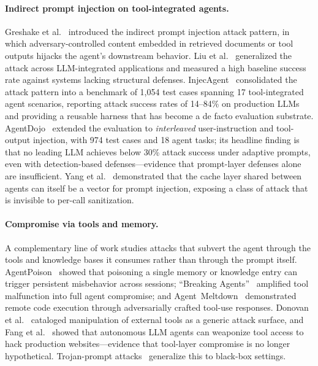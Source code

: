 \paragraph{Indirect prompt injection on tool-integrated agents.}
Greshake et al.~\cite{greshake2023not} introduced the indirect prompt
injection attack pattern, in which adversary-controlled content embedded in
retrieved documents or tool outputs hijacks the agent's downstream
behavior. Liu et al.~\cite{liu2024promptinjection} generalized the attack
across LLM-integrated applications and measured a high baseline success
rate against systems lacking structural defenses.
InjecAgent~\cite{zhan2024injecagent} consolidated the attack pattern into a
benchmark of 1{,}054 test cases spanning 17 tool-integrated agent scenarios,
reporting attack success rates of 14--84\% on production LLMs and providing
a reusable harness that has become a de facto evaluation substrate.
AgentDojo~\cite{debenedetti2024agentdojo} extended the evaluation to
\emph{interleaved} user-instruction and tool-output injection, with 974 test
cases and 18 agent tasks; its headline finding is that no leading LLM
achieves below 30\% attack success under adaptive prompts, even with
detection-based defenses---evidence that prompt-layer defenses alone are
insufficient. Yang et al.~\cite{yang2024cache} demonstrated that the cache
layer shared between agents can itself be a vector for prompt injection,
exposing a class of attack that is invisible to per-call sanitization.

\paragraph{Compromise via tools and memory.}
A complementary line of work studies attacks that subvert the agent through
the tools and knowledge bases it consumes rather than through the prompt
itself. AgentPoison~\cite{chen2024agentsecurity} showed that poisoning a
single memory or knowledge entry can trigger persistent misbehavior across
sessions; ``Breaking Agents''~\cite{zhang2024breaking} amplified tool
malfunction into full agent compromise; and
Agent~Meltdown~\cite{struppek2024agent} demonstrated remote code execution
through adversarially crafted tool-use responses. Donovan
et al.~\cite{donovan2024compromising} cataloged manipulation of external
tools as a generic attack surface, and Fang et al.~\cite{fang2024llm}
showed that autonomous LLM agents can weaponize tool access to hack
production websites---evidence that tool-layer compromise is no longer
hypothetical. Trojan-prompt attacks~\cite{tan2024trojan} generalize this
to black-box settings.

